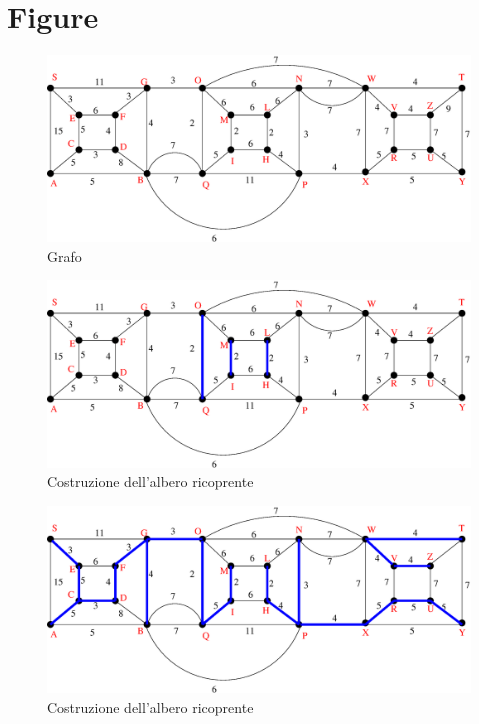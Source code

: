 \documentclass[12pt,a4paper,twoside]{article}
\theoremstyle{definition}
\theoremstyle{definition}
\theoremstyle{theorem}
\begin{document}
	\section{Figure}
	\begin{figure}[h]
		\centering
		\includegraphics[width=\textwidth]{grafo_mtiff.eps}
		\caption{Grafo}\label{grafo} 
	\end{figure}	
	\begin{figure}[h]  
		\centering
		\includegraphics[width=\textwidth]{grafo2.eps}
		\caption{Costruzione dell'albero ricoprente}\label{grafo2}
	\end{figure}	
	\begin{figure}[h]
		\centering
		\includegraphics[width=\textwidth]{grafo5.eps}
		\caption{Costruzione dell'albero ricoprente}\label{grafo5}
	\end{figure}	
\end{document}

